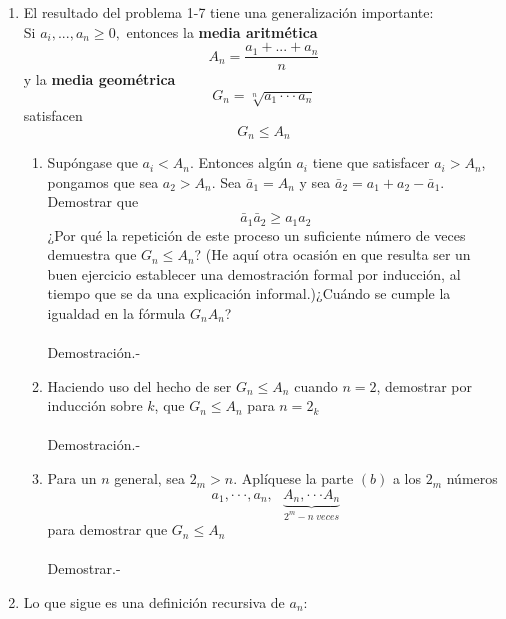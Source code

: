 \begin{enumerate}
       \item El resultado del problema 1-7 tiene una generalización importante:\\
          Si $a_i,...,a_n \geq 0,$ entonces la \textbf{media aritmética} 
          $$A_n=\dfrac{a_1+...+a_n}{n}$$
          y la \textbf{media geométrica}
          $$G_n=\sqrt[n]{a_1\cdot \cdot \cdot a_n}$$
          satisfacen
          $$G_n \leq A_n$$
          \begin{enumerate}[\bfseries (a)]
             \item Supóngase que $a_i<A_n.$ Entonces algún $a_i$ tiene que satisfacer $a_i>A_n$, pongamos que sea $a_2>A_n$. Sea $\bar{a}_1 = A_n$ y sea $\bar{a}_2=a_1+a_2 - \bar{a}_1$. Demostrar que $$\bar{a}_1 \bar{a}_2 \geq a_1 a_2$$ 
                ¿Por qué la repetición de este proceso un suficiente número de veces demuestra que $G_n \leq A_n$? (He aquí otra ocasión en que resulta ser un buen ejercicio establecer una demostración formal por inducción, al tiempo que se da una explicación informal.)¿Cuándo se cumple la igualdad en la fórmula $G_n A_n$?\\\\
                Demostración.-\;
             \item Haciendo uso del hecho de ser $G_n \leq A_n$ cuando $n=2$, demostrar por inducción sobre $k$, que $G_n \leq A_n$ para $n=2_k$\\\\
                Demostración.- \;
             \item Para un $n$ general, sea $2_m>n.$ Aplíquese la parte $(b)$ a los $2_m$ números 
                $$a_1,\cdot \cdot \cdot , a_n,\,\,\,\, \underbrace{A_n,\cdot \cdot \cdot A_n}_{{2^{m}-n \;veces}}$$
                para demostrar que $G_n \leq A_n$\\\\
                Demostrar.- \;
          \end{enumerate}
       \item Lo que sigue es una definición recursiva de $a_n:$\\
          \begin{center}

\end{center}
\end{enumerate}
